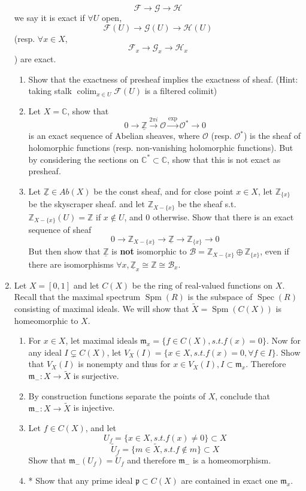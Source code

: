 \documentclass[a4paper,11pt]{article}
\def\bb#1{\mathbb{#1}}
\def\bZ{\mathbb{Z}}
\DeclareMathOperator{\colim}{colim}
\DeclareMathOperator{\Spm}{Spm}
\DeclareMathOperator{\Spec}{Spec}
\begin{document}
\begin{enumerate}[1.]
\[ \mathcal{F}\to\mathcal{G}\to\mathcal{H}\]
we say it is exact if $\forall U$ open,
\[ \mathcal{F}(U)\to\mathcal{G}(U)\to\mathcal{H}(U)\]  
(resp. $\forall x\in X$, \[ \mathcal{F}_x\to\mathcal{G}_x\to\mathcal{H}_x\]) are exact.
\begin{enumerate}
    \item Show that the exactness of presheaf implies the exactness of sheaf. (Hint: taking stalk $\colim_{x\in U}\mathcal{F}(U)$ is a filtered colimit)
    \item Let $X=\bb{C}$, show that 
    \[0\to \underline{\bZ}\xrightarrow{2\pi i}\mathcal{O}\xrightarrow{\exp} \mathcal{O}^*\to 0\]
    is an exact sequence of Abelian sheaves, where $\mathcal{O}$ (resp. $\mathcal{O}^*$) is the sheaf of holomorphic functions (resp. non-vanishing holomorphic functions). But by considering the sections on $\bb{C}^* \subset \bb{C}$, show that this is not exact as presheaf.
    \item Let $\underline{\bZ}\in Ab(X)$ be the const sheaf, and for close point $x\in X$, let $\bZ_{\{x\}}$ be the skyscraper sheaf. and let $\bZ_{X-\{x\}}$ be the sheaf s.t. $ \bZ_{X-\{x\}}(U)=\bZ$ if $x\notin U$, and $0$ otherwise. Show that there is an exact sequence of sheaf 
    \[0\to\bZ_{X-\{x\}}\to \underline{\bZ}\to \bZ_{\{x\}}\to 0 \]
    But then show that $\underline{\bZ}$ is \textbf{not} isomorphic to $\mathcal{B}=\bZ_{X-\{x\}}\oplus \bZ_{\{x\}} $, even if there are isomorphisms $\forall x, \underline{\bZ}_x\cong \bZ\cong \mathcal{B}_x$.
\end{enumerate}

\item Let $X=[0,1]$ and let $C(X)$ be the ring of real-valued functions on $X$. Recall that the maximal spectrum $\Spm(R)$ is the subspace of $\Spec(R)$ consisting of maximal ideals. We will show that $\tilde{X}=\Spm(C(X))$ is homeomorphic to $X$.
\begin{enumerate}
    \item For $x\in X$, let maximal ideals $\mathfrak{m}_x=\{f\in C(X),s.t. f(x)=0\}$. Now for any ideal $I \subsetneq  C(X)$, let $V_X(I)=\{x\in X, s.t. f(x)=0, \forall f\in I\}$. Show that $V_X(I)$ is nonempty and thus for $x\in V_X(I),I\subset \mathfrak{m}_x$. Therefore $\mathfrak{m}_{-}:X\to \tilde{X}$ is surjective.
    \item By construction functions separate the points of $X$, conclude that $\mathfrak{m}_{-}: X\to \tilde{X}$ is injective.
    \item Let $f\in C(X)$, and let 
    \[U_f=\{x\in X, s.t. f(x)\neq0\}\subset X\]
    \[\tilde{U}_f=\{m\in \tilde{X}, s.t. f\notin m\}\subset X\] 
    Show that $\mathfrak{m}_{-}(U_f)=\tilde{U}_f$ and therefore $\mathfrak{m}_{-}$ is a homeomorphism.
    \item* Show that any prime ideal $\mathfrak{p}\subset C(X)$ are contained in exact one $\mathfrak{m}_{x}$.
\end{enumerate}


\end{enumerate}
\end{document}
